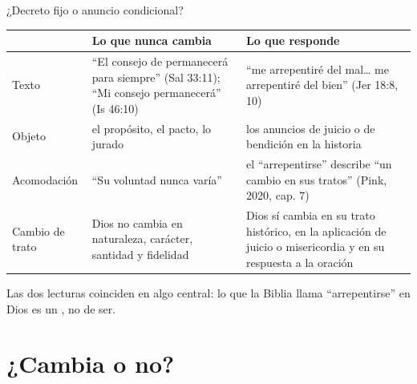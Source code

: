\begin{frame}{¿Decreto fijo o anuncio condicional?}
\scriptsize\renewcommand{\arraystretch}{1.2}
\begin{tabular}{@{}>{\RaggedRight\arraybackslash}p{2.3cm}>{\RaggedRight\arraybackslash}p{4.7cm}>{\RaggedRight\arraybackslash}p{4.8cm}@{}}
\toprule
 & \textbf{Lo que nunca cambia} & \textbf{Lo que responde} \\ \midrule
Texto & ``El consejo de \SENOR{} permanecerá para siempre'' (Sal 33:11); ``Mi consejo permanecerá'' (Is 46:10) & ``me arrepentiré del mal\ldots{} me arrepentiré del bien'' (Jer 18:8, 10) \\
Objeto & el propósito, el pacto, lo jurado & los anuncios de juicio o de bendición en la historia \\
Acomodación & ``Su voluntad nunca varía'' & el ``arrepentirse'' describe ``un cambio en sus tratos'' (Pink, 2020, cap. 7) \\
Cambio de trato & Dios no cambia en naturaleza, carácter, santidad y fidelidad & Dios sí cambia en su trato histórico, en la aplicación de juicio o misericordia y en su respuesta a la oración \\
\bottomrule
\end{tabular}\par\medskip
\small\RaggedRight Las dos lecturas coinciden en algo central: lo que la Biblia llama ``arrepentirse'' en Dios es un , no de ser.\par\smallskip
{}
\end{frame}

\section{¿Cambia o no?}

